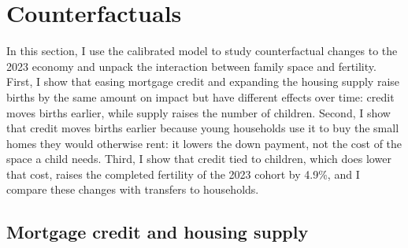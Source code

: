 \providecommand{\pend}{\textcolor{red}{[pending]}}
\providecommand{\oldv}[1]{\textcolor{red}{#1}}
\providecommand{\chk}{\textcolor{red}{$^{\ddagger}$}}
\providecommand{\FCC}{../../output/model/experiments/first_child_cost/20261021}
\newcommand{\PRF}{../../output/model/experiments/housing_supply/20261021_paper_results}
\newcommand{\PFI}{../../output/model/experiments/housing_supply/20261022_fi_all_arms}

\section{Counterfactuals}
\label{sec:policy}

In this section, I use the calibrated model to study counterfactual changes to
the 2023 economy and unpack the interaction between family space and
fertility. First, I show that easing mortgage credit and expanding the housing
supply raise births by the same amount on impact but have different effects
over time: credit moves births earlier, while supply raises the number of
children. Second, I show that credit moves births earlier because young
households use it to buy the small homes they would otherwise rent: it lowers
the down payment, not the cost of the space a child needs. Third, I show that
credit tied to children, which does lower that cost, raises the completed
fertility of the 2023 cohort by 4.9\%, and I compare these changes with
transfers to households.


\subsection{Mortgage credit and housing supply}
\label{sec:policy-design}

